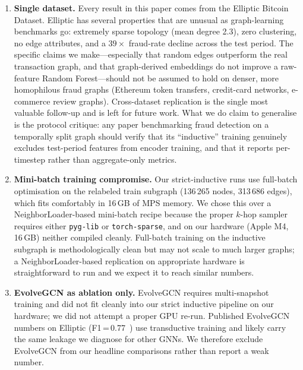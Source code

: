 \begin{enumerate}[leftmargin=*]
  \item \textbf{Single dataset.}  Every result in this paper comes
    from the Elliptic Bitcoin Dataset.  Elliptic has several
    properties that are unusual as graph-learning benchmarks go:
    extremely sparse topology (mean degree 2.3), zero clustering,
    no edge attributes, and a $39\times$ fraud-rate decline across
    the test period.  The specific claims we make---especially that
    random edges outperform the real transaction graph, and that
    graph-derived embeddings do not improve a raw-feature Random
    Forest---should not be assumed to hold on denser, more
    homophilous fraud graphs (Ethereum token transfers, credit-card
    networks, e-commerce review graphs).  Cross-dataset replication
    is the single most valuable follow-up and is left for future
    work.  What we do claim to generalise is the protocol critique:
    any paper benchmarking fraud detection on a temporally split
    graph should verify that its ``inductive'' training genuinely
    excludes test-period features from encoder training, and that
    it reports per-timestep rather than aggregate-only metrics.

  \item \textbf{Mini-batch training compromise.}  Our strict-inductive
    runs use full-batch optimisation on the relabeled train subgraph
    (136\,265 nodes, 313\,686 edges), which fits comfortably in 16\,GB
    of MPS memory.  We chose this over a NeighborLoader-based
    mini-batch recipe because the proper $k$-hop sampler requires
    either \texttt{pyg-lib} or \texttt{torch-sparse}, and on our
    hardware (Apple M4, 16\,GB) neither compiled cleanly.  Full-batch
    training on the inductive subgraph is methodologically clean but
    may not scale to much larger graphs; a NeighborLoader-based
    replication on appropriate hardware is straightforward to run
    and we expect it to reach similar numbers.

  \item \textbf{EvolveGCN as ablation only.}  EvolveGCN requires
    multi-snapshot training and did not fit cleanly into our strict
    inductive pipeline on our hardware; we did not attempt a proper
    GPU re-run.  Published EvolveGCN numbers on Elliptic
    (F1\,=\,0.77~\citep{pareja2020evolvegcn}) use transductive
    training and likely carry the same leakage we diagnose for other
    GNNs.  We therefore exclude EvolveGCN from our headline
    comparisons rather than report a weak number.


\end{enumerate}
